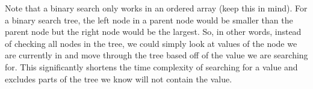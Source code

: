 \documentclass[11pt,a4paper,english]{article}
\begin{document}
\bigskip

Note that a binary search only works in an ordered array (keep this in mind). For a binary search tree, the left node in a parent node would be smaller than the parent node but the right node would be the largest. So, in other words, instead of checking all nodes in the tree, we could simply look at values of the node we are currently in and move through the tree based off of the value we are searching for. This significantly shortens the time complexity of searching for a value and excludes parts of the tree we know will not contain the value.
\end{document}
